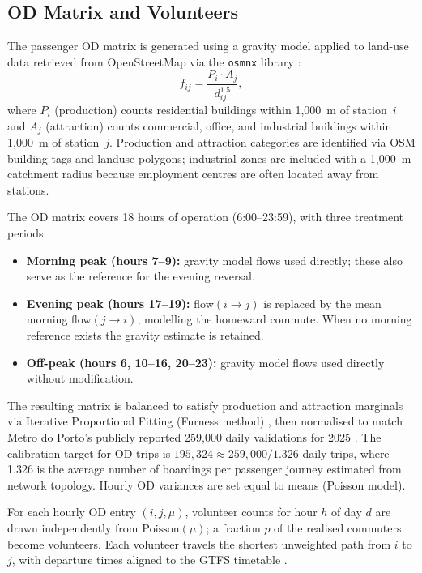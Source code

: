 \documentclass[11pt,a4paper]{article}
\begin{document}
\subsection{OD Matrix and Volunteers}

The passenger OD matrix is generated using a gravity model
\cite{ortuzar2011modelling} applied to land-use data retrieved from
OpenStreetMap \cite{osm2024} via the \texttt{osmnx} library
\cite{boeing2017osmnx}:
\[
  f_{ij} = \frac{P_i \cdot A_j}{d_{ij}^{1.5}},
\]
where $P_i$ (production) counts residential buildings within 1{,}000~m of
station~$i$ and $A_j$ (attraction) counts commercial, office, and industrial
buildings within 1{,}000~m of station~$j$. Production and attraction
categories are identified via OSM building tags and landuse polygons;
industrial zones are included with a 1{,}000~m catchment radius because
employment centres are often located away from stations.

The OD matrix covers 18 hours of operation (6:00--23:59), with three
treatment periods:
\begin{itemize}
  \item \textbf{Morning peak (hours 7--9):} gravity model flows used directly;
        these also serve as the reference for the evening reversal.
  \item \textbf{Evening peak (hours 17--19):} flow$(i\!\to\!j)$ is replaced
        by the mean morning flow$(j\!\to\!i)$, modelling the homeward commute.
        When no morning reference exists the gravity estimate is retained.
  \item \textbf{Off-peak (hours 6, 10--16, 20--23):} gravity model flows used
        directly without modification.
\end{itemize}
The resulting matrix is balanced to satisfy production and attraction
marginals via Iterative Proportional Fitting (Furness method)
\cite{furness1965time}, then normalised to match
Metro do Porto's publicly reported 259{,}000 daily validations for 2025
\cite{metrodoporto2025}. The calibration target for OD trips is
$195{,}324 \approx 259{,}000 / 1.326$ daily trips, where 1.326 is the
average number of boardings per passenger journey estimated from network
topology. Hourly OD variances are set equal to means (Poisson model).

For each hourly OD entry $(i,j,\mu)$, volunteer counts for hour $h$ of day
$d$ are drawn independently from $\mathrm{Poisson}(\mu)$; a fraction $p$ of
the realised commuters become volunteers. Each volunteer travels the shortest
unweighted path from $i$ to $j$, with departure times aligned to the GTFS
timetable \cite{gtfs2006}.
\end{document}
